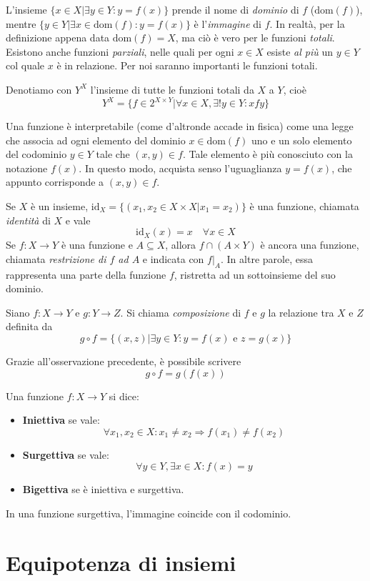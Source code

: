 L'insieme $\{x\in X|\exists y\in Y: y=f(x)\}$ prende il nome di \textit{dominio}
di $f$ ($\text{dom}(f)$), mentre $\{y\in Y|\exists x\in\text{dom}(f):y=f(x)\}$
è l'\textit{immagine} di $f$. In realtà, per la definizione appena data
$\text{dom}(f)=X$, ma ciò è vero per le funzioni \textit{totali}. Esistono
anche funzioni \textit{parziali}, nelle quali per ogni $x\in X$ esiste \textit{al più}
un $y\in Y$ col quale $x$ è in relazione. Per noi saranno importanti le funzioni
totali.

Denotiamo con $Y^X$ l'insieme di tutte le funzioni totali da $X$ a $Y$, cioè
\[ Y^X = \{f\in2^{X\times Y}| \forall x\in X, \exists!y\in Y: xfy\} \]
\begin{osservaz}
Una funzione è interpretabile (come d'altronde accade in fisica) come
una legge che associa ad ogni elemento del dominio $x\in\text{dom}(f)$
uno e un solo elemento del codominio $y\in Y$ tale che $(x,y)\in f$.
Tale elemento è più conosciuto con la notazione $f(x)$. In questo modo,
acquista senso l'uguaglianza $y = f(x)$, che appunto corrisponde a
$(x,y)\in f$.
\end{osservaz}
Se $X$ è un insieme, $\text{id}_X = \{(x_1,x_2\in X\times X| x_1=x_2)\}$ è
una funzione, chiamata \textit{identità} di $X$ e vale \[ \text{id}_X(x)=x \quad \forall x\in X\]
Se $f:X\to Y$ è una funzione e $A\subseteq X$, allora $f\cap(A\times Y)$
è ancora una funzione, chiamata \textit{restrizione di $f$ ad $A$} e indicata
con $f|_A$. In altre parole, essa rappresenta una parte della funzione $f$,
ristretta ad un sottoinsieme del suo dominio.

\begin{tcolorbox}[colback=yellow!30, colframe=yellow!30!black, title={Composizione}]
Siano $f:X\to Y$ e $g:Y\to Z$. Si chiama \textit{composizione}
di $f$ e $g$ la relazione tra $X$ e $Z$ definita da
\[ g\circ f = \{(x,z)| \exists y\in Y: y = f(x) \text{ e } z = g(x)\} \]
\end{tcolorbox}
\begin{osservaz}
Grazie all'osservazione precedente, è possibile scrivere \[ g\circ f = g(f(x)) \]
\end{osservaz}

\begin{tcolorbox}[colback=yellow!30, colframe=yellow!30!black, title={Iniettività, surgettività, bigettività}]
Una funzione $f:X\to Y$ si dice:
\begin{itemize}
    \item \textbf{Iniettiva} se vale: \[ \forall x_1,x_2\in X:x_1 \not= x_2 \Rightarrow f(x_1) \not = f(x_2) \]
    \item \textbf{Surgettiva} se vale: \[ \forall y\in Y, \exists x\in X: f(x) = y \]
    \item \textbf{Bigettiva} se è iniettiva e surgettiva.
\end{itemize}
\end{tcolorbox}

\begin{osservaz}
In una funzione surgettiva, l'immagine coincide con il codominio.
\end{osservaz}




\section{Equipotenza di insiemi}
